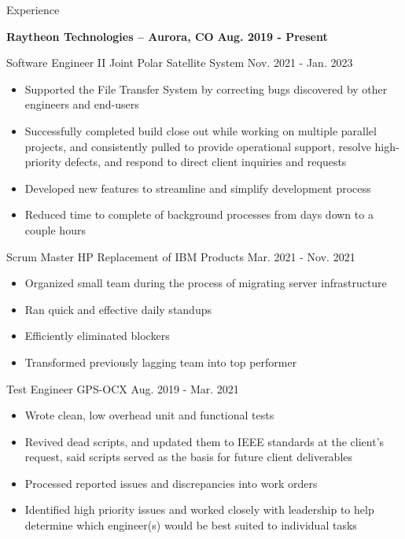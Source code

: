 \documentclass[12pt]{resumeclass}
\begin{document}
\vspace{18pt}
\resumesect
    {Experience}
    {\textbf{\large{Raytheon Technologies -- Aurora, CO}} \hfill \textbf{Aug. 2019 - Present}


    \vspace{3pt}
    \experiencesect
	{Software Engineer II}
	{Joint Polar Satellite System}
	{Nov. 2021 - Jan. 2023}
	{\begin{itemize}[noitemsep,nolistsep]
	    \item Supported the File Transfer System by correcting bugs discovered by other engineers and end-users
	    \item Successfully completed build close out while working on
	    multiple parallel projects, and consistently pulled to provide
	    operational support, resolve high-priority defects, and respond to
	    direct client inquiries and requests
	    \item Developed new features to streamline and simplify development
	    process
	    \item Reduced time to complete of background processes from days down to
	    a couple hours
	\end{itemize}}


    \vspace{3pt}
    \experiencesect
	{Scrum Master}
	{HP Replacement of IBM Products}
	{Mar. 2021 - Nov. 2021}
	{\begin{itemize}[noitemsep,nolistsep]
	    \item Organized small team during the process of migrating server
	    infrastructure
	    \item Ran quick and effective daily standups
	    \item Efficiently eliminated blockers
	    \item Transformed previously lagging team into top performer
	\end{itemize}}


    \vspace{3pt}
    \experiencesect
	{Test Engineer}
	{GPS-OCX}
	{Aug. 2019 - Mar. 2021}
	{\begin{itemize}[noitemsep,nolistsep]
	    \item Wrote clean, low overhead unit and functional tests
	    \item Revived dead scripts, and updated them to IEEE standards at
	    the client's request, said scripts served as the basis for future
	    client deliverables
	    \item Processed reported issues and discrepancies into work orders
	    \item Identified high priority issues and worked closely with leadership to help determine which engineer(s) would be best suited to individual tasks
	\end{itemize}}}
\end{document}
